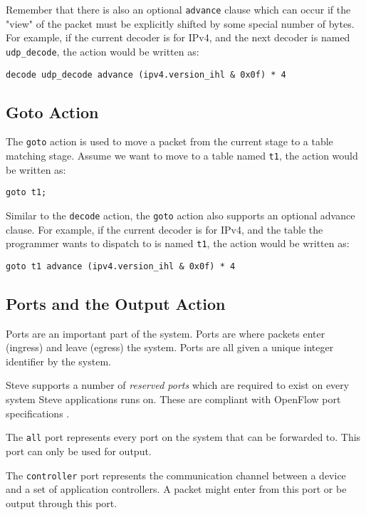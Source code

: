 Remember that there is also an optional \texttt{advance} clause which can occur if the "view" of the packet must be explicitly shifted by some special number of bytes. For example, if the current decoder is for IPv4, and the next decoder is named \texttt{udp\_decode}, the action would be written as:

\begin{lstlisting}
decode udp_decode advance (ipv4.version_ihl & 0x0f) * 4
\end{lstlisting}

\subsection{Goto Action} \label{goto_action_tut}

The \texttt{goto} action is used to move a packet from the current stage to a table matching stage. Assume we want to move to a table named \texttt{t1}, the action would be written as:

\begin{lstlisting}
goto t1;
\end{lstlisting}

Similar to the \texttt{decode} action, the \texttt{goto} action also supports an optional advance clause. For example, if the current decoder is for IPv4, and the table the programmer wants to dispatch to is named \texttt{t1}, the action would be written as:

\begin{lstlisting}
goto t1 advance (ipv4.version_ihl & 0x0f) * 4
\end{lstlisting}

\subsection{Ports and the Output Action} \label{output_action_tut}

Ports are an important part of the system. Ports are where packets enter (ingress) and leave (egress) the system. Ports are all given a unique integer identifier by the system.

Steve supports a number of \textit{reserved ports} which are required to exist on every system Steve applications runs on. These are compliant with OpenFlow port specifications \cite{openflow_spec}.

The \texttt{all} port represents every port on the system that can be forwarded to. This port can only be used for output.

The \texttt{controller} port represents the communication channel between a device and a set of application controllers. A packet might enter from this port or be output through this port.

